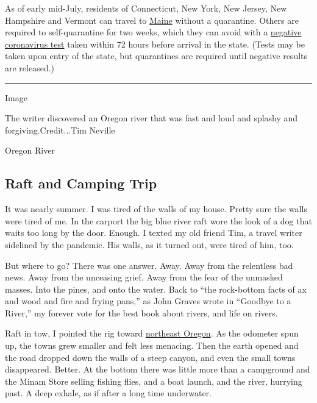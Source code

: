As of early mid-July, residents of Connecticut, New York, New Jersey,
New Hampshire and Vermont can travel to
\href{https://www.nytimes.com/interactive/2020/us/states-reopen-map-coronavirus.html}{Maine}
without a quarantine. Others are required to self-quarantine for two
weeks, which they can avoid with a
\href{https://www.maine.gov/covid19/restartingmaine/keepmainehealthy/faqs}{negative
coronavirus test} taken within 72 hours before arrival in the state.
(Tests may be taken upon entry of the state, but quarantines are
required until negative results are released.)

\begin{center}\rule{0.5\linewidth}{\linethickness}\end{center}

Image

The writer discovered an Oregon river that was fast and loud and splashy
and forgiving.Credit...Tim Neville

Oregon River

\hypertarget{raft-and-camping-trip}{%
\subsection{Raft and Camping Trip}\label{raft-and-camping-trip}}

It was nearly summer. I was tired of the walls of my house. Pretty sure
the walls were tired of me. In the carport the big blue river raft wore
the look of a dog that waits too long by the door. Enough. I texted my
old friend Tim, a travel writer sidelined by the pandemic. His walls, as
it turned out, were tired of him, too.

But where to go? There was one answer. Away. Away from the relentless
bad news. Away from the unceasing grief. Away from the fear of the
unmasked masses. Into the pines, and onto the water. Back to ``the
rock-bottom facts of ax and wood and fire and frying pans,'' as John
Graves wrote in ``Goodbye to a River,'' my forever vote for the best
book about rivers, and life on rivers.

Raft in tow, I pointed the rig toward
\href{http://www.blm.gov/visit/grande-ronde-wild-scenic-river}{northeast
Oregon}. As the odometer spun up, the towns grew smaller and felt less
menacing. Then the earth opened and the road dropped down the walls of a
steep canyon, and even the small towns disappeared. Better. At the
bottom there was little more than a campground and the Minam Store
selling fishing flies, and a boat launch, and the river, hurrying past.
A deep exhale, as if after a long time underwater.

